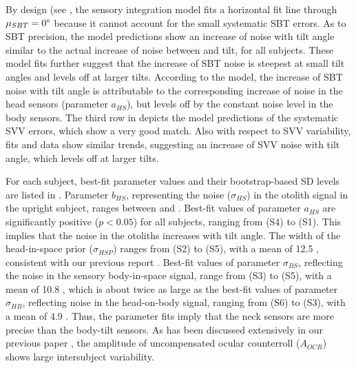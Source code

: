 By design (see , the sensory integration model fits a horizontal fit line through $\mu_{SBT} = 0\degree$ because it cannot account for the small systematic SBT errors. As to SBT precision, the model predictions show an increase of noise with tilt angle similar to the actual increase of noise between  and  tilt, for all subjects. These model fits further suggest that the increase of SBT noise is steepest at small tilt angles and levels off at larger tilts. According to the model, the increase of SBT noise with tilt angle is attributable to the corresponding increase of noise in the head sensors (parameter $a_{HS}$), but levels off by the constant noise level in the body sensors. The third row in  depicts the model predictions of the systematic SVV errors, which show a very good match. Also with respect to SVV variability, fits and data show similar trends, suggesting an increase of SVV noise with tilt angle, which levels off at larger tilts. 

For each subject, best-fit parameter values and their bootstrap-based SD levels are listed in . Parameter $b_{HS}$, representing the noise ($\sigma_{HS}$) in the otolith signal in the upright subject, ranges between  and . Best-fit values of parameter $a_{HS}$ are significantly positive ($p < 0.05$) for all subjects, ranging from  (S4) to  (S1). This implies that the noise in the otoliths increases with tilt angle. The width of the head-in-space prior ($\sigma_{HSP}$) ranges from  (S2) to  (S5), with a mean of 12.5 \textpm {}, consistent with our previous report \cite{devrijer2009}. Best-fit values of parameter $\sigma_{BS}$, reflecting the noise in the sensory body-in-space signal, range from  (S3) to  (S5), with a mean of 10.8 \textpm {}, which is about twice as large as the best-fit values of parameter $\sigma_{HB}$, reflecting noise in the head-on-body signal, ranging from  (S6) to  (S3), with a mean of 4.9 \textdegree. Thus, the parameter fits imply that the neck sensors are more precise than the body-tilt sensors. As has been discussed extensively in our previous paper \cite{devrijer2009}, the amplitude of uncompensated ocular counterroll ($A_{OCR}$) shows large intersubject variability. 

